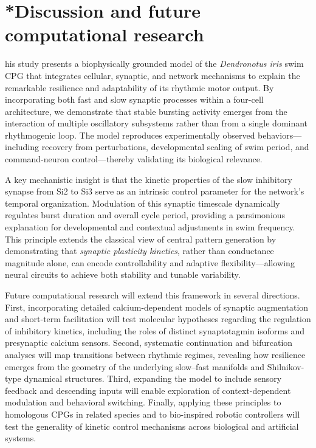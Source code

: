 \documentclass[nofootinbib,aip,amsmath,amssymb,reprint,twocolumn,10pt]{revtex4-2}
\begin{document}
\section{*Discussion and future computational research}

his study presents a biophysically grounded model of the \textit{Dendronotus iris} swim CPG that integrates cellular, synaptic, and network mechanisms to explain the remarkable resilience and adaptability of its rhythmic motor output. By incorporating both fast and slow synaptic processes within a four-cell architecture, we demonstrate that stable bursting activity emerges from the interaction of multiple oscillatory subsystems rather than from a single dominant rhythmogenic loop. The model reproduces experimentally observed behaviors—including recovery from perturbations, developmental scaling of swim period, and command-neuron control—thereby validating its biological relevance.

A key mechanistic insight is that the kinetic properties of the slow inhibitory synapse from Si2 to Si3 serve as an intrinsic control parameter for the network’s temporal organization. Modulation of this synaptic timescale dynamically regulates burst duration and overall cycle period, providing a parsimonious explanation for developmental and contextual adjustments in swim frequency. This principle extends the classical view of central pattern generation by demonstrating that \textit{synaptic plasticity kinetics}, rather than conductance magnitude alone, can encode controllability and adaptive flexibility—allowing neural circuits to achieve both stability and tunable variability.

Future computational research will extend this framework in several directions. First, incorporating detailed calcium-dependent models of synaptic augmentation and short-term facilitation will test molecular hypotheses regarding the regulation of inhibitory kinetics, including the roles of distinct synaptotagmin isoforms and presynaptic calcium sensors. Second, systematic continuation and bifurcation analyses will map transitions between rhythmic regimes, revealing how resilience emerges from the geometry of the underlying slow–fast manifolds and Shilnikov-type dynamical structures. Third, expanding the model to include sensory feedback and descending inputs will enable exploration of context-dependent modulation and behavioral switching. Finally, applying these principles to homologous CPGs in related species and to bio-inspired robotic controllers will test the generality of kinetic control mechanisms across biological and artificial systems.
\end{document}
